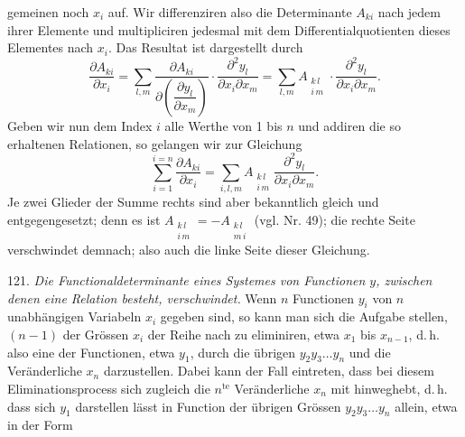gemeinen noch $x_i$ auf. Wir differenziren also die Determinante $A_{ki}$ nach jedem ihrer Elemente und multipliciren jedesmal mit dem Differentialquotienten dieses Elementes nach $x_i$. Das Resultat ist dargestellt durch
\[
\frac{\partial A_{ki}}{\partial x_i} = \sum_{l,m} \frac{\partial A_{ki}}{\partial\left(\dfrac{\partial y_l}{\partial x_m}\right)} \cdot \frac{\partial^2 y_l}{\partial x_i \partial x_m} = \sum_{l,m} A_{\substack{k\,l\\ i\,m}} \cdot \frac{\partial^2 y_l}{\partial x_i \partial x_m}.
\]
Geben wir nun dem Index $i$ alle Werthe von 1 bis $n$ und addiren die so erhaltenen Relationen, so gelangen wir zur Gleichung
\[
\sum_{i=1}^{i=n} \frac{\partial A_{ki}}{\partial x_i} = \sum_{i,l,m} A_{\substack{k\,l\\ i\,m}} \frac{\partial^2 y_l}{\partial x_i \partial x_m}.
\]
Je zwei Glieder der Summe rechts sind aber bekanntlich gleich und entgegengesetzt; denn es ist $A_{\substack{k\,l\\ i\,m}} = -A_{\substack{k\,l\\ m\,i}}$ (vgl. Nr. 49); die rechte Seite verschwindet demnach; also auch die linke Seite dieser Gleichung.

121. \textit{Die Functionaldeterminante eines Systemes von Functionen $y$, zwischen denen eine Relation besteht, verschwindet.} Wenn $n$ Functionen $y_i$ von $n$ unabhängigen Variabeln $x_i$ gegeben sind, so kann man sich die Aufgabe stellen, $(n-1)$ der Grössen $x_i$ der Reihe nach zu eliminiren, etwa $x_1$ bis $x_{n-1}$, d.\,h. also eine der Functionen, etwa $y_1$, durch die übrigen $y_2 y_3 \ldots y_n$ und die Veränderliche $x_n$ darzustellen. Dabei kann der Fall eintreten, dass bei diesem Eliminationsprocess sich zugleich die $n^{\mathrm{te}}$ Veränderliche $x_n$ mit hinweghebt, d.\,h. dass sich $y_1$ darstellen lässt in Function der übrigen Grössen $y_2 y_3 \ldots y_n$ allein, etwa in der Form


